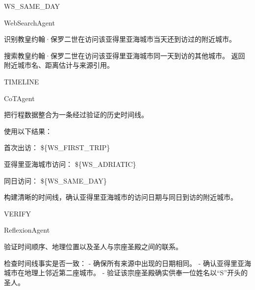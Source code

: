 \begin{userprompt}[title={用户提示词}]
\quad{}



\quad{}WS\_SAME\_DAY

\quad{}WebSearchAgent

\quad{}
识别教皇约翰·保罗二世在访问该亚得里亚海城市当天还到访过的附近城市。

\quad{}

\qquad{}
搜索教皇约翰·保罗二世在访问该亚得里亚海城市同一天到访的其他城市。
返回附近城市名、距离估计与来源引用。

\quad{}



\quad{}TIMELINE

\quad{}CoTAgent

\quad{}
把行程数据整合为一条经过验证的历史时间线。

\quad{}

\qquad{}
使用以下结果：

首次出访：
\$\{WS\_FIRST\_TRIP\}

亚得里亚海城市访问：
\$\{WS\_ADRIATIC\}

同日访问：
\$\{WS\_SAME\_DAY\}

构建清晰的时间线，确认亚得里亚海城市的访问日期与同日到访的附近城市。

\quad{}



\quad{}VERIFY

\quad{}ReflexionAgent

\quad{}
验证时间顺序、地理位置以及圣人与宗座圣殿之间的联系。

\quad{}

\qquad{}
检查时间线事实是否一致：
- 确保所有来源中出现的日期相同。
- 确认亚得里亚海城市在地理上邻近第二座城市。
- 验证该宗座圣殿确实供奉一位姓名以“S”开头的圣人。


\end{userprompt}
